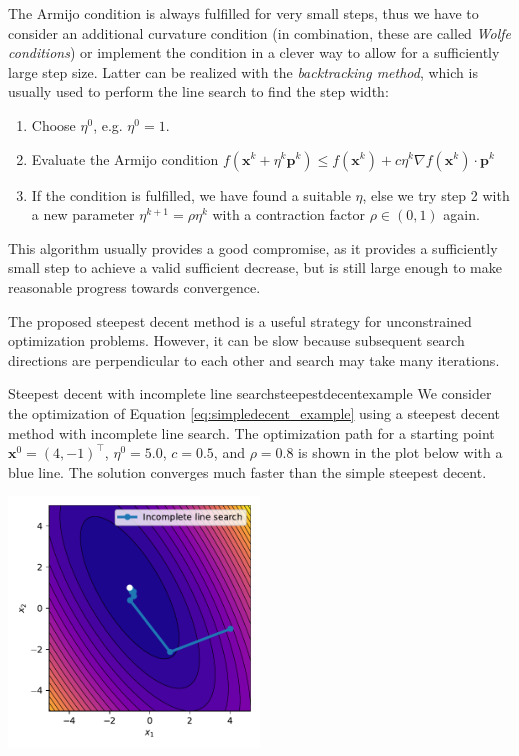 The Armijo condition is always fulfilled for very small steps, thus we have to consider an additional curvature condition (in combination, these are called \emph{Wolfe conditions}) or implement the condition in a clever way to allow for a sufficiently large step size. Latter can be realized with the \emph{backtracking method}, which is usually used to perform the line search to find the step width: 
\begin{enumerate}
    \item Choose $\eta^0$, e.g. $\eta^0=1$.
    \item Evaluate the Armijo condition $f(\mathbf{x}^k + \eta^k \mathbf{p}^k) \le f(\mathbf{x}^k) + c \eta^k \nabla f(\mathbf{x}^k) \cdot \mathbf{p}^k $
    \item If the condition is fulfilled, we have found a suitable $\eta$, else we try step 2 with a new parameter $\eta^{k+1}=\rho \eta^k$ with a contraction factor $\rho \in (0,1)$ again.
\end{enumerate}
This algorithm usually provides a good compromise, as it provides a sufficiently small step to achieve a valid sufficient decrease, but is still large enough to make reasonable progress towards convergence.

The proposed steepest decent method is a useful strategy for unconstrained optimization problems. However, it can be slow because subsequent search directions are perpendicular to each other and search may take many iterations.

\begin{example}{Steepest decent with incomplete line search}{steepestdecentexample}
    We consider the optimization of Equation \eqref{eq:simpledecent_example} using a steepest decent method with incomplete line search. The optimization path for a starting point $\mathbf{x}^0= (4, -1)^\top$, $\eta^0=5.0$, $c=0.5$, and $\rho=0.8$ is shown in the plot below with a blue line. The solution converges much faster than the simple steepest decent.
    \begin{center}
        \includegraphics[width=0.5\textwidth]{figures/steepest_decent.pdf}
    \end{center}   
\end{example}

